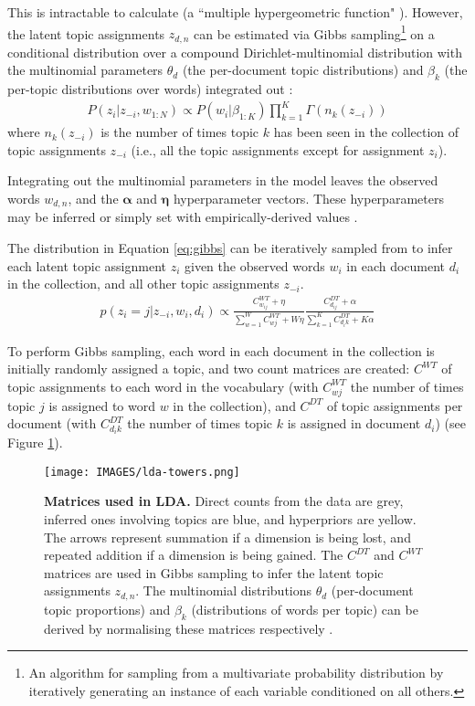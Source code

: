 This is intractable to calculate (a ``multiple hypergeometric function" \cite{blei2003latent,dickey1983multiple}). However, the latent topic assignments $z_{d,n}$ can be estimated via Gibbs sampling\footnote{An algorithm for sampling from a multivariate probability distribution by iteratively generating an instance of each variable conditioned on all others.} \cite{geman1984stochastic} on a conditional distribution over a compound Dirichlet-multinomial distribution with the multinomial parameters $\theta_d$ (the per-document topic distributions) and $\beta_k$ (the per-topic distributions over words) integrated out \cite{blei2003latent,steyvers2007probabilistic}:
\begin{align}
P(z_i|z_{-i},w_{1:N}) \propto P(w_i|\beta_{1:K})\prod_{k=1}^K \Gamma(n_k(z_{-i}))
\end{align}
where $n_k(z_{-i})$ is the number of times topic $k$ has been seen in the collection of topic assignments $z_{-i}$ (i.e., all the topic assignments except for assignment $z_i$).

Integrating out the multinomial parameters in the model leaves the observed words $w_{d,n}$, and the $\boldsymbol{\alpha}$ and $\boldsymbol{\eta}$ hyperparameter vectors. These hyperparameters may be inferred or simply set with empirically-derived values \cite{steyvers2007probabilistic}.

The distribution in Equation \ref{eq:gibbs} can be iteratively sampled from to infer each latent topic assignment $z_i$ given the observed words $w_i$ in each document $d_i$ in the collection, and all other topic assignments $z_{-i}$.
\begin{align}
p(z_i=j | z_{-i},w_i,d_i) \propto \frac{C_{w_{ij}}^{WT}+\eta}{\sum_{w=1}^WC_{wj}^{WT}+W\eta}  \frac{C_{d_{ij}}^{DT}+\alpha}{\sum_{k=1}^KC_{d_{i}k}^{DT}+K\alpha}
\label{eq:gibbs}
\end{align}

To perform Gibbs sampling, each word in each document in the collection is initially randomly assigned a topic, and two count matrices are created: $C^{WT}$ of topic assignments to each word in the vocabulary (with $C_{wj}^{WT}$ the number of times topic $j$ is assigned to word $w$ in the collection), and $C^{DT}$ of topic assignments per document (with $C_{d_{i}k}^{DT}$ the number of times topic $k$ is assigned in document $d_i$) \cite{steyvers2007probabilistic} (see Figure \ref{fig:lda-towers}).

\begin{figure}
\centering
\texttt{[image: IMAGES/lda-towers.png]}
\caption[Matrices used in LDA]{\textbf{Matrices used in LDA.} Direct counts from the data are grey, inferred ones involving topics are blue, and hyperpriors are yellow. The arrows represent summation if a dimension is being lost, and repeated addition if a dimension is being gained. The $C^{DT}$ and $C^{WT}$ matrices are used in Gibbs sampling to infer the latent topic assignments $z_{d,n}$. The multinomial distributions $\theta_d$ (per-document topic proportions) and $\beta_k$ (distributions of words per topic) can be derived by normalising these matrices respectively \cite{blei2003latent,steyvers2007probabilistic}.}
\label{fig:lda-towers}
\end{figure}

